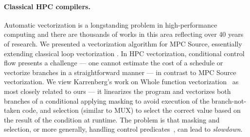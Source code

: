\paragraph{Classical HPC compilers.}
Automatic vectorization is a longstanding problem in high-performance computing and
there are thousands of works in this area reflecting over 40 years of research. We presented a vectorization
algorithm for MPC Source, essentially extending classical loop vectorization \cite{Allen:1987}. In HPC vectorization, conditional control flow
presents a challenge --- one cannot estimate the cost of a schedule or vectorize branches in a straightforward manner --- in contrast to
MPC Source vectorization.
We view Karrenberg's work on Whole function vectorization~\cite{Karrenberg:2015} as most closely related to ours --- it linearizes the program and vectorizes
both branches of a conditional applying masking to avoid execution of the branch-not-taken code, and selection (similar to MUX) to select the correct value based on the
result of the condition at runtime.
The problem is that masking and selection, or more generally, handling control predicates~\cite{Benabderrahmane:2010,Karrenberg:2015},
can lead to \emph{slowdown}.

